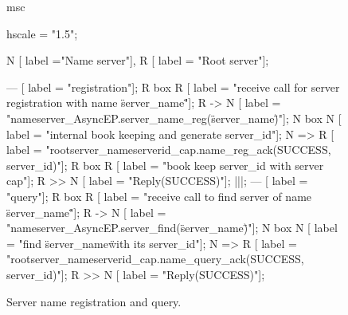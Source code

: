 \begin{figure}[htb]
\begin{center}
\begin{msc}
msc {
    hscale = "1.5";

    N [ label ="Name server"],
    R [ label = "Root server"];
    
    --- [ label = "registration"];
    R box R [ label = "receive call for server registration with name \"server\_name\""];
    R -> N [ label = "nameserver\_AsyncEP.server\_name\_reg(\"server\_name\")"];
    N box N [ label = "internal book keeping and generate server\_id"];
    N => R [ label = "rootserver\_nameserverid\_cap.name\_reg\_ack(SUCCESS, server\_id)"];
    R box R [ label = "book keep server\_id with server cap"];
    R >> N [ label = "Reply(SUCCESS)"];
    |||;
    --- [ label = "query"];
    R box R [ label = "receive call to find server of name \"server\_name\""];
    R -> N [ label = "nameserver\_AsyncEP.server\_find(\"server\_name\")"];
    N box N [ label = "find \"server\_name\" with its server\_id"];
    N => R [ label = "rootserver\_nameserverid\_cap.name\_query\_ack(SUCCESS, server\_id)"];
    R >> N [ label = "Reply(SUCCESS)"];
}
\end{msc}
\end{center}
\caption{Server name registration and query.}
\end{figure}
